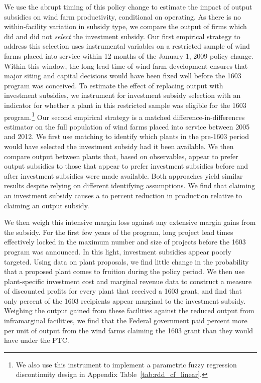 \documentclass[12pt]{article}
\begin{document}
We use the abrupt timing of this policy change to estimate the impact of output subsidies on wind farm productivity, conditional on operating. As there is no within-facility variation in subsidy type, we compare the output of firms which did and did not \textit{select} the investment subsidy. Our first empirical strategy to address this selection uses instrumental variables on a restricted sample of wind farms placed into service within 12 months of the January 1, 2009 policy change. Within this window, the long lead time of wind farm development ensures that major siting and capital decisions would have been fixed well before the 1603 program was conceived. To estimate the effect of replacing output with investment subsidies, we instrument for investment subsidy selection with an indicator for whether a plant in this restricted sample was eligible for the 1603 program.\footnote{We also use this instrument to implement a parametric fuzzy regression discontinuity design in Appendix Table~\ref{tab:rdd_cf_linear}.} Our second empirical strategy is a matched difference-in-differences estimator on the full population of wind farms placed into service between 2005 and 2012. We first use matching to identify which plants in the pre-1603 period would have selected the investment subsidy had it been available. We then compare output between plants that, based on observables, appear to prefer output subsidies to those that appear to prefer investment subsidies before and after investment subsidies were made available. Both approaches yield similar results despite relying on different identifying assumptions. We find that claiming an investment subsidy causes a to percent reduction in production relative to claiming an output subsidy. 

We then weigh this intensive margin loss against any extensive margin gains from the subsidy. For the first few years of the program, long project lead times effectively locked in the maximum number and size of projects before the 1603 program was announced. In this light, investment subsidies appear poorly targeted. Using data on plant proposals, we find little change in the probability that a proposed plant comes to fruition during the policy period. We then use plant-specific investment cost and marginal revenue data to construct a measure of discounted profits for every plant that received a 1603 grant, and find that only percent of the 1603 recipients appear marginal to the investment subsidy. Weighing the output gained from these facilities against the reduced output from inframarginal facilities, we find that the Federal government paid percent more per unit of output from the wind farms claiming the 1603 grant than they would have under the PTC.
\end{document}
